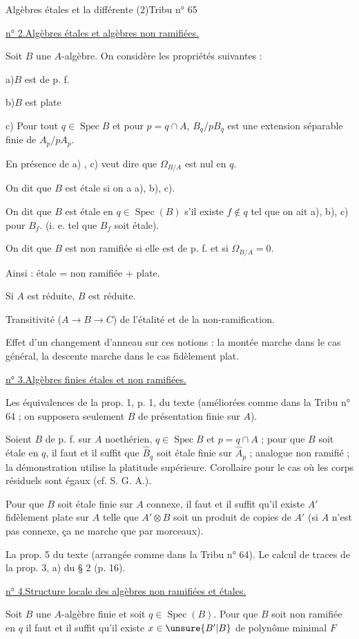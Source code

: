 
Algèbres étales et la différente (2)\hfill Tribu n° 65

\uline{n° 2.}\quad \uline{Algèbres étales et algèbres non ramifiées.}

Soit $B$ une $A$-algèbre. On considère les propriétés suivantes :

a)\quad $B$ est de p. f.

b)\quad $B$ est plate

c) Pour tout $q\in\operatorname{Spec}B$ et pour $p=q\cap A$, $B_q/pB_q$ est une extension séparable finie de $A_p/pA_p$.

En présence de a) , c) veut dire que $\Omega_{B/A}$ est nul en $q$.

On dit que $B$ est étale si on a a), b), c).

On dit que $B$ est étale en $q\in\operatorname{Spec}(B)$ s'il existe $f\notin q$ tel que on ait a), b), c) pour $B_f$. (i. e. tel que $B_f$ soit étale).

On dit que $B$ est non ramifiée si elle est de p. f. et si $\Omega_{B/A}=0$.

Ainsi : étale = non ramifiée + plate.

Si $A$ est réduite, $B$ est réduite.

Transitivité ($A\longrightarrow B\longrightarrow C$) de l'étalité et de la non-ramification.

Effet d'un changement d'anneau sur ces notions : la montée marche dans le cas général, la descente marche dans le cas fidèlement plat.

\uline{n° 3.}\quad \uline{Algèbres finies étales et non ramifiées.}

Les équivalences de la prop. 1, p. 1, du texte (améliorées comme dans la Tribu n° 64 ; on supposera seulement $B$ de présentation finie sur $A$).

Soient $B$ de p. f. sur $A$ noethérien, $q\in\operatorname{Spec}B$ et $p=q\cap A$ ; pour que $B$ soit étale en $q$, il faut et il suffit que $\hat{B}_q$ soit étale finie sur $\hat{A}_p$ ; analogue non ramifié ; la démonstration utilise la platitude supérieure. Corollaire pour le cas où les corps résiduels sont égaux (cf. S. G. A.).

Pour que $B$ soit étale finie sur $A$ connexe, il faut et il suffit qu'il existe $A'$ fidèlement plate sur $A$ telle que $A'\otimes B$ soit un produit de copies de $A'$ (si $A$ n'est pas connexe, ça ne marche que par morceaux).

La prop. 5 du texte (arrangée comme dans la Tribu n° 64). Le calcul de traces de la prop. 3, a) du § 2 (p. 16).

\uline{n° 4.}\quad \uline{Structure locale des algèbres non ramifiées et étales.}

Soit $B$ une $A$-algèbre finie et soit $q\in\operatorname{Spec}(B)$. Pour que $B$ soit non ramifiée en $q$ il faut et il suffit qu'il existe $x\in\unsure{B'|B}$ de polynôme minimal $F$

